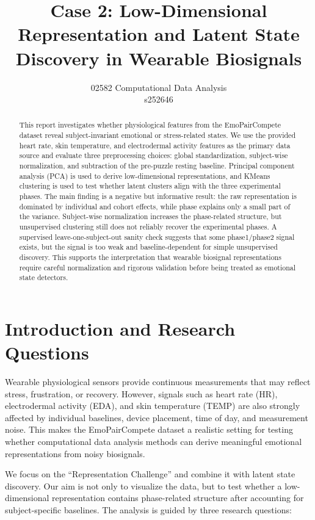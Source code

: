 \documentclass{article}
\title{Case 2: Low-Dimensional Representation and Latent State Discovery in Wearable Biosignals}
\author{02582 Computational Data Analysis\\s252646}
\date{}
\begin{document}
\maketitle

\begin{abstract}
This report investigates whether physiological features from the EmoPairCompete dataset reveal subject-invariant emotional or stress-related states. We use the provided heart rate, skin temperature, and electrodermal activity features as the primary data source and evaluate three preprocessing choices: global standardization, subject-wise normalization, and subtraction of the pre-puzzle resting baseline. Principal component analysis (PCA) is used to derive low-dimensional representations, and KMeans clustering is used to test whether latent clusters align with the three experimental phases. The main finding is a negative but informative result: the raw representation is dominated by individual and cohort effects, while phase explains only a small part of the variance. Subject-wise normalization increases the phase-related structure, but unsupervised clustering still does not reliably recover the experimental phases. A supervised leave-one-subject-out sanity check suggests that some phase1/phase2 signal exists, but the signal is too weak and baseline-dependent for simple unsupervised discovery. This supports the interpretation that wearable biosignal representations require careful normalization and rigorous validation before being treated as emotional state detectors.
\end{abstract}

\section*{Introduction and Research Questions}
Wearable physiological sensors provide continuous measurements that may reflect stress, frustration, or recovery. However, signals such as heart rate (HR), electrodermal activity (EDA), and skin temperature (TEMP) are also strongly affected by individual baselines, device placement, time of day, and measurement noise. This makes the EmoPairCompete dataset a realistic setting for testing whether computational data analysis methods can derive meaningful emotional representations from noisy biosignals.

We focus on the ``Representation Challenge'' and combine it with latent state discovery. Our aim is not only to visualize the data, but to test whether a low-dimensional representation contains phase-related structure after accounting for subject-specific baselines. The analysis is guided by three research questions:
\end{document}
